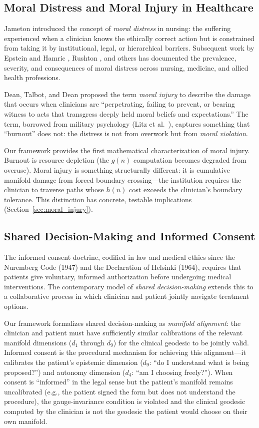 \documentclass[12pt]{article}
\theoremstyle{definition}
\theoremstyle{remark}
\begin{document}
\subsection{Moral Distress and Moral Injury in Healthcare}

Jameton \cite{jameton1984} introduced the concept of \emph{moral distress} in nursing: the suffering experienced when a clinician knows the ethically correct action but is constrained from taking it by institutional, legal, or hierarchical barriers.  Subsequent work by Epstein and Hamric \cite{epstein2009}, Rushton \cite{rushton2018}, and others has documented the prevalence, severity, and consequences of moral distress across nursing, medicine, and allied health professions.

Dean, Talbot, and Dean \cite{dean2019} proposed the term \emph{moral injury} to describe the damage that occurs when clinicians are ``perpetrating, failing to prevent, or bearing witness to acts that transgress deeply held moral beliefs and expectations.''  The term, borrowed from military psychology (Litz et al.\ \cite{litz2009}), captures something that ``burnout'' does not: the distress is not from overwork but from \emph{moral violation}.

Our framework provides the first mathematical characterization of moral injury.  Burnout is resource depletion (the $g(n)$ computation becomes degraded from overuse).  Moral injury is something structurally different: it is cumulative manifold damage from forced boundary crossing---the institution requires the clinician to traverse paths whose $h(n)$ cost exceeds the clinician's boundary tolerance.  This distinction has concrete, testable implications (Section~\ref{sec:moral_injury}).

\subsection{Shared Decision-Making and Informed Consent}

The informed consent doctrine, codified in law and medical ethics since the Nuremberg Code (1947) and the Declaration of Helsinki (1964), requires that patients give voluntary, informed authorization before undergoing medical interventions.  The contemporary model of \emph{shared decision-making} \cite{charles1997,elwyn2012} extends this to a collaborative process in which clinician and patient jointly navigate treatment options.

Our framework formalizes shared decision-making as \emph{manifold alignment}: the clinician and patient must have sufficiently similar calibrations of the relevant manifold dimensions ($d_1$ through $d_9$) for the clinical geodesic to be jointly valid.  Informed consent is the procedural mechanism for achieving this alignment---it calibrates the patient's epistemic dimension ($d_9$: ``do I understand what is being proposed?'') and autonomy dimension ($d_4$: ``am I choosing freely?'').  When consent is ``informed'' in the legal sense but the patient's manifold remains uncalibrated (e.g., the patient signed the form but does not understand the procedure), the gauge-invariance condition is violated and the clinical geodesic computed by the clinician is not the geodesic the patient would choose on their own manifold.
\end{document}
